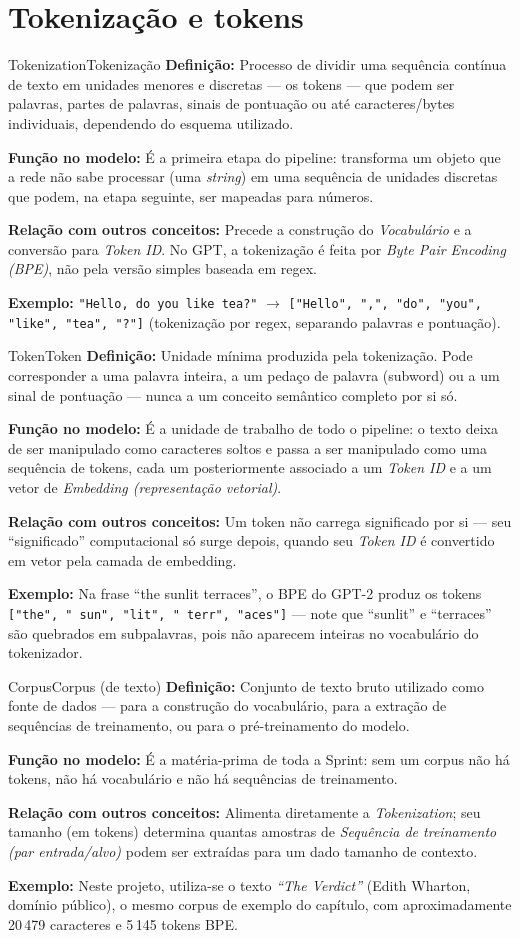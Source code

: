 \documentclass[11pt,a4paper]{article}
\newcommand{\campo}[2]{\textbf{\textcolor{accentblue}{#1:}} #2\par\smallskip}
\begin{document}
\section{Tokenização e tokens}

\begin{termo}{Tokenization}{Tokenização}
\campo{Definição}{Processo de dividir uma sequência contínua de texto em unidades
menores e discretas --- os tokens --- que podem ser palavras, partes de palavras,
sinais de pontuação ou até caracteres/bytes individuais, dependendo do esquema
utilizado.}
\campo{Função no modelo}{É a primeira etapa do pipeline: transforma um objeto que a
rede não sabe processar (uma \emph{string}) em uma sequência de unidades discretas que
podem, na etapa seguinte, ser mapeadas para números.}
\campo{Relação com outros conceitos}{Precede a construção do \emph{Vocabulário} e a
conversão para \emph{Token ID}. No GPT, a tokenização é feita por
\emph{Byte Pair Encoding (BPE)}, não pela versão simples baseada em regex.}
\campo{Exemplo}{\texttt{"Hello, do you like tea?"} $\rightarrow$ \texttt{["Hello", ",",
"do", "you", "like", "tea", "?"]} (tokenização por regex, separando palavras e
pontuação).}
\end{termo}

\begin{termo}{Token}{Token}
\campo{Definição}{Unidade mínima produzida pela tokenização. Pode corresponder a uma
palavra inteira, a um pedaço de palavra (subword) ou a um sinal de pontuação --- nunca a
um conceito semântico completo por si só.}
\campo{Função no modelo}{É a unidade de trabalho de todo o pipeline: o texto deixa de
ser manipulado como caracteres soltos e passa a ser manipulado como uma sequência de
tokens, cada um posteriormente associado a um \emph{Token ID} e a um vetor de
\emph{Embedding (representação vetorial)}.}
\campo{Relação com outros conceitos}{Um token não carrega significado por si --- seu
``significado'' computacional só surge depois, quando seu \emph{Token ID} é
convertido em vetor pela camada de embedding.}
\campo{Exemplo}{Na frase ``the sunlit terraces'', o BPE do GPT-2 produz os tokens
\texttt{["the", " sun", "lit", " terr", "aces"]} --- note que ``sunlit'' e ``terraces''
são quebrados em subpalavras, pois não aparecem inteiras no vocabulário do
tokenizador.}
\end{termo}

\begin{termo}{Corpus}{Corpus (de texto)}
\campo{Definição}{Conjunto de texto bruto utilizado como fonte de dados --- para a
construção do vocabulário, para a extração de sequências de treinamento, ou para o
pré-treinamento do modelo.}
\campo{Função no modelo}{É a matéria-prima de toda a Sprint: sem um corpus não há
tokens, não há vocabulário e não há sequências de treinamento.}
\campo{Relação com outros conceitos}{Alimenta diretamente a \emph{Tokenization}; seu
tamanho (em tokens) determina quantas amostras de \emph{Sequência de treinamento
(par entrada/alvo)} podem ser extraídas para um dado tamanho de contexto.}
\campo{Exemplo}{Neste projeto, utiliza-se o texto \emph{``The Verdict''}
(Edith Wharton, domínio público), o mesmo corpus de exemplo do capítulo, com
aproximadamente 20\,479 caracteres e 5\,145 tokens BPE.}
\end{termo}
\end{document}
